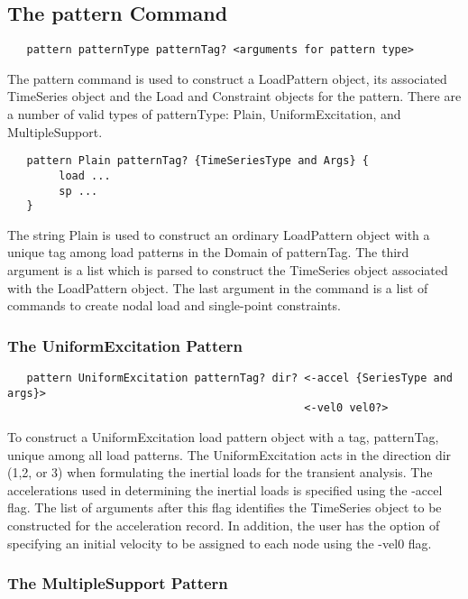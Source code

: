\documentclass[12pt]{article}
\begin{document}
\subsection{The pattern Command}
{\sf\small
\begin{verbatim}
   pattern patternType patternTag? <arguments for pattern type>
\end{verbatim}
}

The pattern command is used to construct a LoadPattern object, its
associated TimeSeries object and the Load and Constraint objects for
the pattern. There are a number of valid types of patternType: Plain,
UniformExcitation, and MultipleSupport.

{\sf\small
\begin{verbatim}
   pattern Plain patternTag? {TimeSeriesType and Args} {
        load ...
        sp ...
   }	
\end{verbatim}
}

\noindent The string Plain is used to construct an ordinary
LoadPattern object with a unique tag among load patterns in the Domain
of patternTag. The third argument is a list which is parsed to
construct the TimeSeries object associated with the LoadPattern
object. The last argument in the command is a list of commands to
create nodal load and single-point constraints.



\subsubsection{The UniformExcitation Pattern}


{\sf\small
\begin{verbatim}
   pattern UniformExcitation patternTag? dir? <-accel {SeriesType and args}> 
                                              <-vel0 vel0?>
\end{verbatim}
}

\noindent To construct a UniformExcitation load pattern object with a
tag, patternTag, unique among all load patterns. The UniformExcitation
acts in the direction dir (1,2, or 3) when formulating the inertial loads
for the transient analysis. The accelerations used in determining the
inertial loads is specified using the -accel flag. The list of
arguments after this flag identifies the TimeSeries object to be
constructed for the acceleration record. In addition, the user has the
option of specifying an initial velocity to be assigned to each node
using the -vel0 flag.

\subsubsection{The MultipleSupport Pattern}
\end{document}
